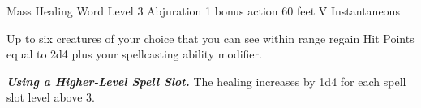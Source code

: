 \DndSpellHeader%
    {Mass Healing Word}
    {Level 3 Abjuration}
    {1 bonus action}
    {60 feet}
    {V}
    {Instantaneous}

Up to six creatures of your choice that you can see within range regain Hit Points equal to 2d4 plus your spellcasting ability modifier.

\textbf{\textit{Using a Higher-Level Spell Slot.}} The healing increases by 1d4 for each spell slot level above 3.
